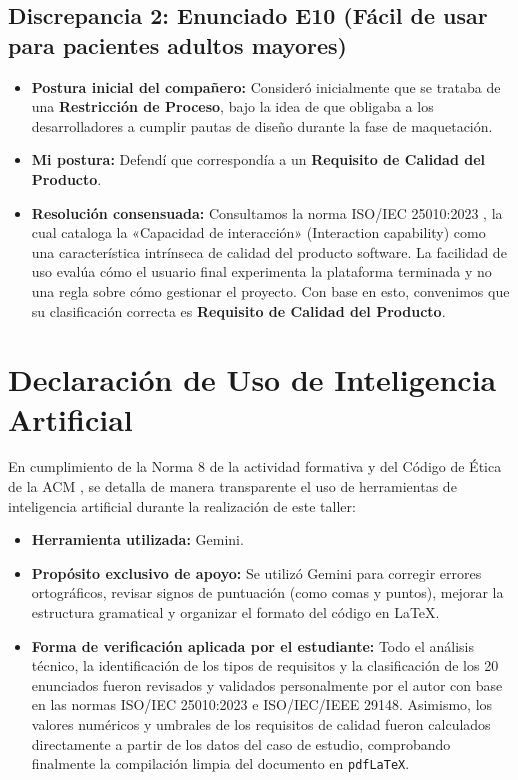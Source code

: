 \documentclass[11pt,a4paper]{article}
\begin{document}
\subsection*{Discrepancia 2: Enunciado E10 (Fácil de usar para pacientes adultos mayores)}
\begin{itemize}
    \item \textbf{Postura inicial del compañero:} Consideró inicialmente que se trataba de una \textbf{Restricción de Proceso}, bajo la idea de que obligaba a los desarrolladores a cumplir pautas de diseño durante la fase de maquetación.
    \item \textbf{Mi postura:} Defendí que correspondía a un \textbf{Requisito de Calidad del Producto}.
    \item \textbf{Resolución consensuada:} Consultamos la norma ISO/IEC 25010:2023 \cite{iso25010}, la cual cataloga la «Capacidad de interacción» (Interaction capability) como una característica intrínseca de calidad del producto software. La facilidad de uso evalúa cómo el usuario final experimenta la plataforma terminada y no una regla sobre cómo gestionar el proyecto. Con base en esto, convenimos que su clasificación correcta es \textbf{Requisito de Calidad del Producto}.
\end{itemize}

\section{Declaración de Uso de Inteligencia Artificial}

En cumplimiento de la Norma 8 de la actividad formativa y del Código de Ética de la ACM \cite{acm2018}, se detalla de manera transparente el uso de herramientas de inteligencia artificial durante la realización de este taller:

\begin{itemize}
    \item \textbf{Herramienta utilizada:} Gemini.
    \item \textbf{Propósito exclusivo de apoyo:} Se utilizó Gemini para corregir errores ortográficos, revisar signos de puntuación (como comas y puntos), mejorar la estructura gramatical y organizar el formato del código en \LaTeX.
    \item \textbf{Forma de verificación aplicada por el estudiante:} Todo el análisis técnico, la identificación de los tipos de requisitos y la clasificación de los 20 enunciados fueron revisados y validados personalmente por el autor con base en las normas ISO/IEC 25010:2023 e ISO/IEC/IEEE 29148. Asimismo, los valores numéricos y umbrales de los requisitos de calidad fueron calculados directamente a partir de los datos del caso de estudio, comprobando finalmente la compilación limpia del documento en \texttt{pdfLaTeX}.
\end{itemize}
\end{document}
